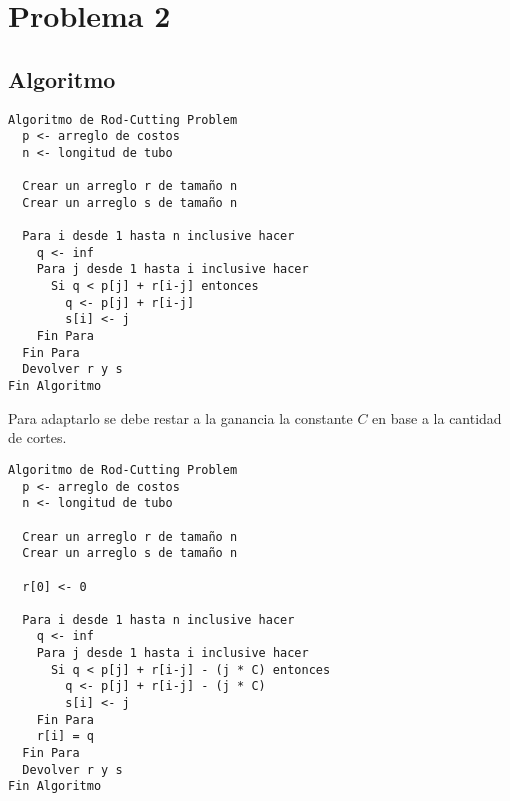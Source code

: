 
\section*{Problema 2}
\subsection*{Algoritmo}


\begin{verbatim}
Algoritmo de Rod-Cutting Problem
  p <- arreglo de costos
  n <- longitud de tubo
  
  Crear un arreglo r de tamaño n
  Crear un arreglo s de tamaño n
  
  Para i desde 1 hasta n inclusive hacer
    q <- inf
    Para j desde 1 hasta i inclusive hacer
      Si q < p[j] + r[i-j] entonces
        q <- p[j] + r[i-j]
        s[i] <- j
    Fin Para
  Fin Para
  Devolver r y s
Fin Algoritmo
\end{verbatim}

Para adaptarlo se debe restar a la ganancia la constante \(C\) en base a la cantidad de cortes.

\begin{verbatim}
Algoritmo de Rod-Cutting Problem
  p <- arreglo de costos
  n <- longitud de tubo
  
  Crear un arreglo r de tamaño n
  Crear un arreglo s de tamaño n
  
  r[0] <- 0

  Para i desde 1 hasta n inclusive hacer
    q <- inf
    Para j desde 1 hasta i inclusive hacer
      Si q < p[j] + r[i-j] - (j * C) entonces
        q <- p[j] + r[i-j] - (j * C)
        s[i] <- j
    Fin Para
    r[i] = q
  Fin Para
  Devolver r y s
Fin Algoritmo
\end{verbatim}
